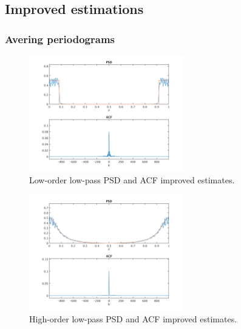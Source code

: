 
\subsection{Improved estimations}


\subsubsection{Avering periodograms}

\begin{figure}[!ht]
\centering
\includegraphics[width=0.6\textwidth]{bilder/Lab1/Lab1fig8.svg}
\caption{Low-order low-pass PSD and ACF improved estimates.}
\label{fig:Lab1fig8}
\end{figure}

\begin{figure}[!ht]
\centering
\includegraphics[width=0.6\textwidth]{bilder/Lab1/Lab1fig7.svg}
\caption{High-order low-pass PSD and ACF improved estimates.}
\label{fig:Lab1fig7}
\end{figure}

